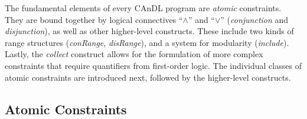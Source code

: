     \noindent
    The fundamental elements of every CAnDL program are {\it atomic}
    constraints.
    They are bound together by logical connectives ``$\land$''
    and ``$\lor$'' ({\it conjunction} and {\it disjunction}), as well as other
    higher-level constructs.
    These include two kinds of range structures ({\it conRange},
    {\it disRange}), and a system for modularity ({\it include}).
    Lastly, the {\it collect} construct allows for the formulation of more
    complex constraints that require quantifiers from first-order logic.
    The individual classes of atomic constraints are introduced next,
    followed by the higher-level constructs.

\subsection{Atomic Constraints}

